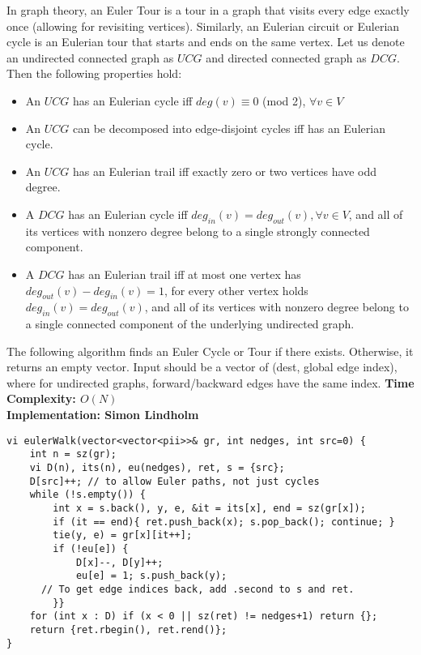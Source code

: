 In graph theory, an Euler Tour is a tour in a graph
that visits every edge exactly once 
(allowing for revisiting vertices). 
Similarly, an Eulerian circuit or Eulerian cycle is an 
Eulerian tour that starts and ends on the same vertex.
\newline
\newline
Let us denote an undirected connected graph as $UCG$ and directed connected graph as $DCG$.
Then the following properties hold:
\begin{itemize}
\item{An $UCG$ has an Eulerian cycle iff $deg(v) \equiv 0$ (mod 2), $\forall v \in V$}
\item{An $UCG$ can be decomposed into edge-disjoint cycles iff has an Eulerian cycle.}
\item{An $UCG$ has an Eulerian trail iff exactly zero or two vertices have odd degree.}
\item{A $DCG$ has an Eulerian cycle iff $deg_{in}(v) = deg_{out}(v), \forall v \in V$, and all of its vertices with nonzero degree belong to a single strongly connected component.}
\item{A $DCG$ has an Eulerian trail iff at most one vertex has $deg_{out}(v) - deg_{in}(v) = 1$, for every other vertex holds $deg_{in}(v) = deg_{out}(v)$, and all of its vertices with nonzero degree belong to a single connected component of the underlying undirected graph.}
\end{itemize}
The following algorithm finds an Euler Cycle or Tour if there exists.
Otherwise, it returns an empty vector.
Input should be a vector of (dest, global edge index), where
for undirected graphs, forward/backward edges have the same index.
\newline
\newline
\textbf{Time Complexity: $O(N)$}\\
\textbf{Implementation: Simon Lindholm}

\begin{lstlisting}
vi eulerWalk(vector<vector<pii>>& gr, int nedges, int src=0) {
	int n = sz(gr);
	vi D(n), its(n), eu(nedges), ret, s = {src};
	D[src]++; // to allow Euler paths, not just cycles
	while (!s.empty()) {
		int x = s.back(), y, e, &it = its[x], end = sz(gr[x]);
		if (it == end){ ret.push_back(x); s.pop_back(); continue; }
		tie(y, e) = gr[x][it++];
		if (!eu[e]) {
			D[x]--, D[y]++;
			eu[e] = 1; s.push_back(y);
      // To get edge indices back, add .second to s and ret.
		}}
	for (int x : D) if (x < 0 || sz(ret) != nedges+1) return {};
	return {ret.rbegin(), ret.rend()};
}
\end{lstlisting}

